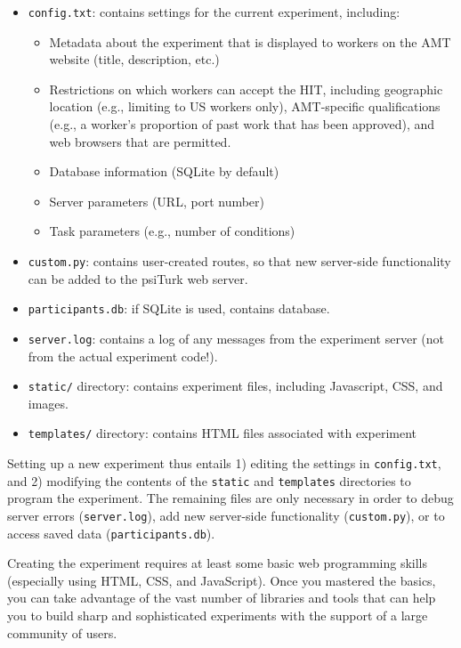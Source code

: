 \documentclass[twocolumn]{svjour3}          %
\begin{document}
\begin{itemize}
\item \texttt{config.txt}: contains settings for the current experiment, including:

\begin{itemize}
\item Metadata about the experiment that is displayed to workers on the AMT website (title, description, etc.)
\item Restrictions on which workers can accept the HIT, including geographic location (e.g., limiting to US workers only), AMT-specific qualifications (e.g., a worker's proportion of past work that has been approved), and web browsers that are permitted.
\item Database information (SQLite by default)
\item Server parameters (URL, port number)
\item Task parameters (e.g., number of conditions)
\end{itemize}


\item \texttt{custom.py}: contains user-created routes, so that new server-side functionality can be added to the psiTurk web server. 

\item \texttt{participants.db}: if SQLite is used, contains database.

\item \texttt{server.log}: contains a log of any messages from the experiment server (not from the actual experiment code!).

\item \texttt{static/} directory: contains experiment files, including Javascript, CSS, and images.

\item \texttt{templates/} directory: contains HTML files associated with experiment 
\end{itemize}

Setting up a new experiment thus entails 1) editing the settings in \texttt{config.txt}, and 2) modifying the contents of the \texttt{static} and \texttt{templates} directories to program the experiment.
The remaining files are only necessary in order to debug server errors (\texttt{server.log}), add new server-side functionality (\texttt{custom.py}), or to access saved data (\texttt{participants.db}).

Creating the experiment requires at least some basic web programming skills (especially using HTML, CSS, and JavaScript).
Once you mastered the basics, you can take advantage of the vast number of libraries and tools that can help you to build sharp and sophisticated experiments with the support of a large community of users.
\end{document}
